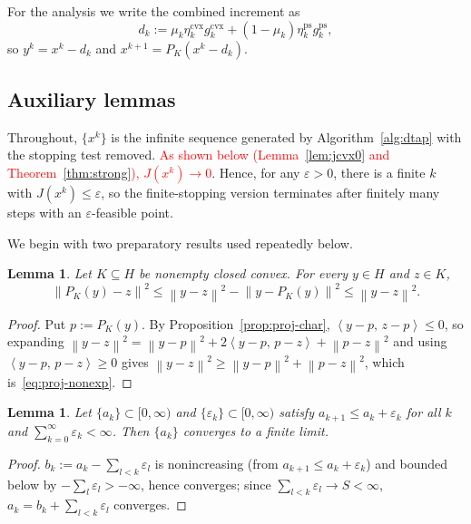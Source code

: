 \documentclass[]{interact}
\theoremstyle{plain}
\newtheorem{lemma}[theorem]{Lemma}
\theoremstyle{definition}
\theoremstyle{remark}
\newcommand{\norm}[1]{\left\lVert #1 \right\rVert}
\newcommand{\inner}[2]{\left\langle #1,\, #2 \right\rangle}
\newcommand{\cvx}{\mathrm{cvx}}
\newcommand{\ps}{\mathrm{ps}}
\begin{document}
For the analysis we write the combined increment as
\begin{equation}\label{eq:dk}
d_k:=\mu_k\eta^{\cvx}_k g^{\cvx}_k+(1-\mu_k)\eta^{\ps}_k g^{\ps}_k,
\end{equation}
so $y^k=x^k-d_k$ and $x^{k+1}=P_K(x^k-d_k)$.

\subsection{Auxiliary lemmas}\label{ssec:aux}
Throughout, $\{x^k\}$ is the infinite sequence generated by Algorithm~\ref{alg:dtap} with the stopping test removed. \leavevmode\textcolor{red}{As shown below (Lemma~\ref{lem:jcvx0} and Theorem~\ref{thm:strong}), $J(x^k)\to 0$}. Hence, for any $\varepsilon>0$, there is a finite $k$ with $J(x^k)\le\varepsilon$, so the finite-stopping version terminates after finitely many steps with an $\varepsilon$-feasible point.

We begin with two preparatory results used repeatedly below.

\begin{lemma}\label{lem:proj-nonexp}
Let $K\subseteq H$ be nonempty closed convex. For every $y\in H$ and $z\in K$,
\begin{equation}\label{eq:proj-nonexp}
\norm{P_K(y)-z}^2\le\norm{y-z}^2-\norm{y-P_K(y)}^2\le\norm{y-z}^2 .
\end{equation}
\end{lemma}
\begin{proof}
Put $p:=P_K(y)$. By Proposition~\ref{prop:proj-char}, $\inner{y-p}{z-p}\le0$, so expanding $\norm{y-z}^2=\norm{y-p}^2+2\inner{y-p}{p-z}+\norm{p-z}^2$ and using $\inner{y-p}{p-z}\ge0$ gives $\norm{y-z}^2\ge\norm{y-p}^2+\norm{p-z}^2$, which is~\eqref{eq:proj-nonexp}.
\end{proof}

\begin{lemma}\label{lem:seq}
Let $\{a_k\}\subset[0,\infty)$ and $\{\varepsilon_k\}\subset[0,\infty)$ satisfy $a_{k+1}\le a_k+\varepsilon_k$ for all $k$ and $\sum_{k=0}^\infty\varepsilon_k<\infty$. Then $\{a_k\}$ converges to a finite limit.
\end{lemma}
\begin{proof}
$b_k:=a_k-\sum_{l<k}\varepsilon_l$ is nonincreasing (from $a_{k+1}\le a_k+\varepsilon_k$) and bounded below by $-\sum_l\varepsilon_l>-\infty$, hence converges; since $\sum_{l<k}\varepsilon_l\to S<\infty$, $a_k=b_k+\sum_{l<k}\varepsilon_l$ converges.
\end{proof}
\end{document}
